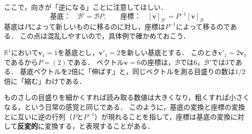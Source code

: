 \begin{remark}[基底と座標の変換の向き]
  ここで，向きが「逆になる」ことに注意してほしい．
  \[
    \text{基底：} \quad \mathcal{B}' = \mathcal{B}P,
    \qquad
    \text{座標：} \quad [\bm{v}]_{\mathcal{B}'} = P^{-1} [\bm{v}]_{\mathcal{B}}
  \]
  基底は$P$によって新しいものに移るのに対し，座標は$P^{-1}$によって移るのである．
  この点は混乱しやすいので，具体例で確かめておこう．

  $\mathbb{R}^1$において$\bm{v}_1 = 1$を基底とし，$\bm{v}'_1 = 2$を新しい基底とする．
  このとき$\bm{v}'_1 = 2\bm{v}_1$であるから$P = (2)$である．
  ベクトル$\bm{v} = 6$の座標は，$\mathcal{B}$では$6$，$\mathcal{B}'$では$3$である．
  基底ベクトルを$2$倍に「伸ばす」と，同じベクトルを測る目盛りの数は$1/2$倍に「縮む」わけである．

  ものさしの目盛りを細かくすれば読み取る数値は大きくなり，粗くすれば小さくなる，という日常の感覚と同じである．
  このように，基底の変換と座標の変換とに互いに逆の行列（$P$と$P^{-1}$）が現れることを指して，座標は基底の変換に対して\textbf{反変的}に変換する，と表現することがある．
\end{remark}

